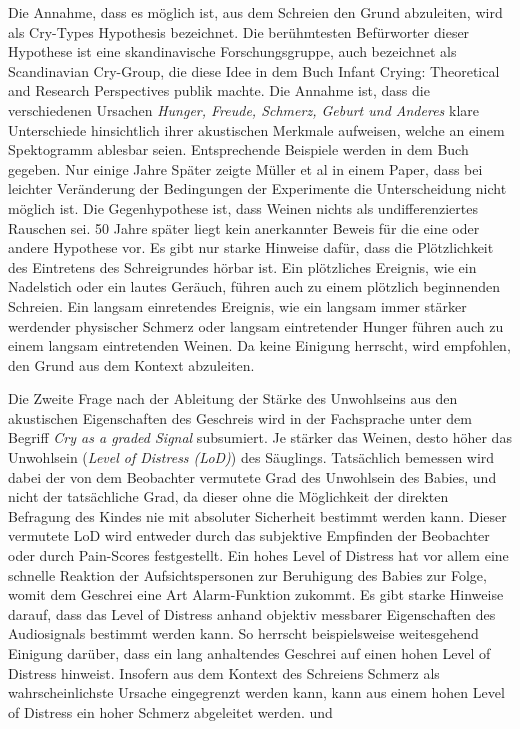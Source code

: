 Die Annahme, dass es möglich ist, aus dem Schreien den Grund abzuleiten, wird als \glqq Cry-Types Hypothesis\grqq{} bezeichnet. Die berühmtesten Befürworter dieser Hypothese ist eine skandinavische Forschungsgruppe, auch bezeichnet als \glqq Scandinavian Cry-Group\grqq , die diese Idee in dem Buch \glqq Infant Crying: Theoretical and Research Perspectives\grqq \cite{crygroup} publik machte. Die Annahme ist, dass die verschiedenen Ursachen \emph{Hunger, Freude, Schmerz, Geburt und Anderes} klare Unterschiede hinsichtlich ihrer akustischen Merkmale aufweisen, welche an einem Spektogramm ablesbar seien. Entsprechende Beispiele werden in dem Buch gegeben. Nur einige Jahre Später zeigte Müller et al \cite{cryisnoise} in einem Paper, dass bei leichter Veränderung der Bedingungen der Experimente die Unterscheidung nicht möglich ist. Die Gegenhypothese ist, dass Weinen \glqq nichts als undifferenziertes Rauschen\grqq{} sei. 50 Jahre später liegt kein anerkannter Beweis für die eine oder andere Hypothese vor. Es gibt nur starke Hinweise dafür, dass die Plötzlichkeit des Eintretens des Schreigrundes hörbar ist. Ein plötzliches Ereignis, wie ein Nadelstich oder ein lautes Geräuch, führen auch zu einem plötzlich beginnenden Schreien. Ein langsam einretendes Ereignis, wie ein langsam immer stärker werdender physischer Schmerz oder langsam eintretender Hunger führen auch zu einem langsam eintretenden Weinen. Da keine Einigung herrscht, wird empfohlen, den Grund aus dem Kontext abzuleiten.\cite{signal}

Die Zweite Frage nach der Ableitung der Stärke des Unwohlseins aus den akustischen Eigenschaften des Geschreis wird in der Fachsprache unter dem Begriff \emph{Cry as a graded Signal} subsumiert. Je \glqq stärker\grqq{} das Weinen, desto höher das Unwohlsein (\emph{Level of Distress (LoD)}) des Säuglings. Tatsächlich bemessen wird dabei der von dem Beobachter vermutete Grad des Unwohlsein des Babies, und nicht der tatsächliche Grad, da dieser ohne die Möglichkeit der direkten Befragung des Kindes nie mit absoluter Sicherheit bestimmt werden kann. Dieser vermutete LoD  wird entweder durch das subjektive Empfinden der Beobachter oder durch Pain-Scores festgestellt. Ein hohes Level of Distress hat vor allem eine schnelle Reaktion der Aufsichtspersonen zur Beruhigung des Babies zur Folge, womit dem Geschrei eine Art Alarm-Funktion zukommt. Es gibt starke Hinweise darauf, dass das Level of Distress anhand objektiv messbarer Eigenschaften des Audiosignals bestimmt werden kann. So herrscht beispielsweise weitesgehend Einigung darüber, dass ein \glqq lang\grqq{} anhaltendes Geschrei auf einen hohen Level of Distress hinweist. Insofern aus dem Kontext des Schreiens Schmerz als wahrscheinlichste Ursache eingegrenzt werden kann, kann aus einem hohen Level of Distress ein hoher Schmerz abgeleitet werden. \cite{signal} und \cite{lod}

